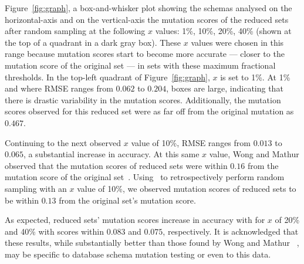 
Figure~\ref{fig:graph}, a box-and-whisker plot showing the schemas analysed on the horizontal-axis and on the vertical-axis the
mutation scores of the reduced sets after random sampling at the following $x$ values: 1\%, 10\%, 20\%, 40\% (shown at the top
of a quadrant in a dark gray box). These $x$ values were chosen in this range because mutation scores start to become more accurate
 --- closer to the mutation score of the original set --- in sets with these maximum fractional thresholds. In the top-left quadrant
of Figure~\ref{fig:graph}, $x$ is set to 1\%. At 1\% and where RMSE ranges from $0.062$ to $0.204$, boxes are large, indicating that
there is drastic variability in the mutation scores. Additionally, the mutation scores observed for this reduced set were as far off
from the original mutation as $0.467$.

Continuing to the next observed $x$ value of 10\%, RMSE ranges from $0.013$ to $0.065$, a
substantial increase in accuracy. At this same  $x$ value, Wong and Mathur observed that the mutation scores of reduced sets were
within $0.16$ from the mutation score of the original set~\cite{mathur1994empirical, wong1993mutation}. Using \mr~to retrospectively
perform random sampling with an $x$ value of 10\%, we observed mutation scores of reduced sets to be within $0.13$ from the original
set's mutation score.

As expected, reduced sets' mutation scores increase in accuracy with for $x$ of 20\% and 40\% with scores within $0.083$ and $0.075$,
respectively. It is acknowledged that these results, while substantially better than those found by Wong and Mathur
~\cite{mathur1994empirical, wong1993mutation}, may be specific to database schema mutation testing or even to this data.


